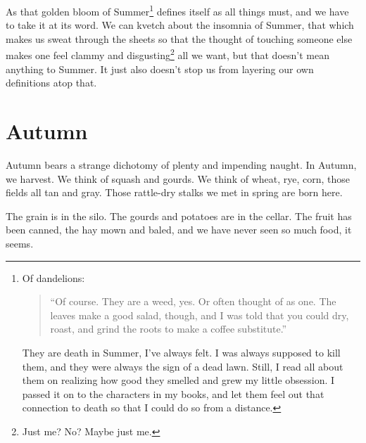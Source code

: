 \documentclass[12pt]{memoir}
\begin{document}
As that golden bloom of Summer\footnote{Of dandelions:\begin{quote}``Of course. They are a weed, yes. Or often thought of as one. The leaves make a good salad, though, and I was told that you could dry, roast, and grind the roots to make a coffee substitute.''\par
\parencite[161]{toledot}\end{quote}\par
They are death in Summer, I've always felt. I was always supposed to kill them, and they were always the sign of a dead lawn. Still, I read all about them on realizing how good they smelled and grew my little obsession. I passed it on to the characters in my books, and let them feel out that connection to death so that I could do so from a distance.} defines itself as all things must, and we have to take it at its word. We can kvetch about the insomnia of Summer, that which makes us sweat through the sheets so that the thought of touching someone else makes one feel clammy and disgusting\footnote{Just me? No? Maybe just me.} all we want, but that doesn't mean anything to Summer. It just also doesn't stop us from layering our own definitions atop that.


\clearpage

\section*{Autumn}

Autumn bears a strange dichotomy of plenty and impending naught. In Autumn, we harvest. We think of squash and gourds. We think of wheat, rye, corn, those fields all tan and gray. Those rattle-dry stalks we met in spring are born here.

The grain is in the silo. The gourds and potatoes are in the cellar. The fruit has been canned, the hay mown and baled, and we have never seen so much food, it seems.
\end{document}
